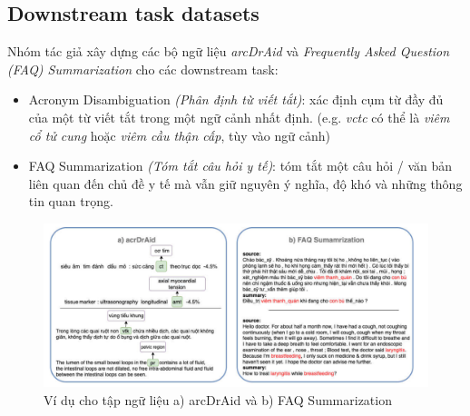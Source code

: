 \subsection{Downstream task datasets}
Nhóm tác giả xây dựng các bộ ngữ liệu \textit{arcDrAid} và \textit{Frequently Asked Question (FAQ) Summarization} cho các downstream task:
\begin{itemize}
\item Acronym Disambiguation \textit{(Phân định từ viết tắt)}: xác định cụm từ đầy đủ của một từ viết tắt trong một ngữ cảnh nhất định. (e.g. \textit{vctc} có thể là \textit{viêm cổ tử cung} hoặc \textit{viêm cầu thận cấp}, tùy vào ngữ cảnh)
\item FAQ Summarization \textit{(Tóm tắt câu hỏi y tế)}: tóm tắt một câu hỏi / văn bản liên quan đến chủ đề y tế mà vẫn giữ nguyên ý nghĩa, độ khó và những thông tin quan trọng.
\end{itemize}

\begin{figure}
\centering
\includegraphics[scale=.65]{img/finetune-datasets.PNG}
\caption{Ví dụ cho tập ngữ liệu a) arcDrAid và b) FAQ Summarization\cite{minh-EtAl:2022:LREC}}
\label{fig:finetune-datasets}
\end{figure}

